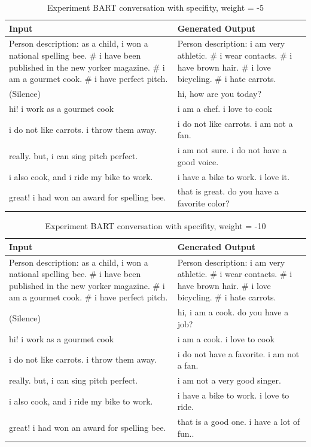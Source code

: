 \begin{table}[ht]
\centering
 \begin{tabular}{|p{7cm}|p{7cm}|} 
 \hline\hline
 \textbf{Input} & \textbf{Generated Output} \\
 \hline\hline
 Person description: as a child, i won a national spelling bee. \# i have been published in the new yorker magazine. \# i am a gourmet cook. \# i have perfect pitch. & Person description: i am very athletic. \# i wear contacts. \# i have brown hair. \# i love bicycling. \# i hate carrots. \\
 \hline
 (Silence) & hi, how are you today? \\ 
 \hline
 hi! i work as a gourmet cook & i am a chef. i love to cook \\
 \hline
 i do not like carrots. i throw them away. & i do not like carrots. i am not a fan. \\
 \hline 
 really. but, i can sing pitch perfect. & i am not sure. i do not have a good voice. \\
 \hline
 i also cook, and i ride my bike to work. & i have a bike to work. i love it. \\
 \hline 
 great! i had won an award for spelling bee. & that is great. do you have a favorite color? \\
 \hline\hline
 \end{tabular}
 \caption{Experiment BART conversation with specifity, weight = -5}
\label{tab:bart_conversation_idf5}
\end{table}

\begin{table}[ht]
\centering
 \begin{tabular}{|p{7cm}|p{7cm}|} 
 \hline\hline
 \textbf{Input} & \textbf{Generated Output} \\
 \hline\hline
 Person description: as a child, i won a national spelling bee. \# i have been published in the new yorker magazine. \# i am a gourmet cook. \# i have perfect pitch. & Person description: i am very athletic. \# i wear contacts. \# i have brown hair. \# i love bicycling. \# i hate carrots. \\
 \hline
 (Silence) & hi, i am a cook. do you have a job? \\ 
 \hline
 hi! i work as a gourmet cook & i am a cook. i love to cook \\
 \hline
 i do not like carrots. i throw them away. & i do not have a favorite. i am not a fan. \\
 \hline 
 really. but, i can sing pitch perfect. & i am not a very good singer. \\
 \hline
 i also cook, and i ride my bike to work. & i have a bike to work. i love to ride. \\
 \hline 
 great! i had won an award for spelling bee. & that is a good one. i have a lot of fun.. \\
 \hline\hline
 \end{tabular}
 \caption{Experiment BART conversation with specifity, weight = -10}
\label{tab:bart_conversation_idf5}
\end{table}

